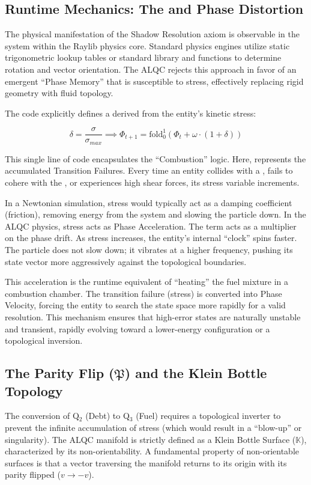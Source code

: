 \documentclass[12pt]{amsart}
\begin{document}
\subsection{Runtime Mechanics: The  and Phase Distortion}\label{appendixH.2}
The physical manifestation of the Shadow Resolution axiom is observable in the  system within the Raylib physics core. Standard physics engines utilize static trigonometric lookup tables or standard library  and  functions to determine rotation and vector orientation. The ALQC rejects this approach in favor of an emergent ``Phase Memory'' that is susceptible to stress, effectively replacing rigid geometry with fluid topology.

The code explicitly defines a  derived from the entity's kinetic stress:

\[
\delta = \frac{\sigma}{\sigma_{max}} \implies \Phi_{t+1} = \text{fold}_{0}^{1} \left( \Phi_t + \omega \cdot (1 + \delta) \right)
\]

This single line of code encapsulates the ``Combustion'' logic. Here,  represents the accumulated Transition Failures. Every time an entity collides with a , fails to cohere with the , or experiences high shear forces, its stress variable increments.

In a Newtonian simulation, stress would typically act as a damping coefficient (friction), removing energy from the system and slowing the particle down. In the ALQC physics, stress acts as Phase Acceleration. The term  acts as a multiplier on the phase drift. As stress increases, the entity's internal ``clock'' spins faster. The particle does not slow down; it vibrates at a higher frequency, pushing its state vector more aggressively against the topological boundaries.

This acceleration is the runtime equivalent of ``heating'' the fuel mixture in a combustion chamber. The transition failure (stress) is converted into Phase Velocity, forcing the entity to search the state space more rapidly for a valid resolution. This mechanism ensures that high-error states are naturally unstable and transient, rapidly evolving toward a lower-energy configuration or a topological inversion.

\subsection{The Parity Flip ($\mathfrak{P}$) and the Klein Bottle Topology}\label{appendixH.3}
The conversion of Q$_2$ (Debt) to Q$_3$ (Fuel) requires a topological inverter to prevent the infinite accumulation of stress (which would result in a ``blow-up'' or singularity). The ALQC manifold is strictly defined as a Klein Bottle Surface ($\mathbb{K}$), characterized by its non-orientability. A fundamental property of non-orientable surfaces is that a vector traversing the manifold returns to its origin with its parity flipped ($v \to -v$).
\end{document}
